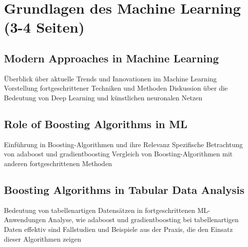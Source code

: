\section{Grundlagen des Machine Learning (3-4 Seiten)}
\subsection{Modern Approaches in Machine Learning}
Überblick über aktuelle Trends und Innovationen im Machine Learning
Vorstellung fortgeschrittener Techniken und Methoden
Diskussion über die Bedeutung von Deep Learning und künstlichen neuronalen Netzen
\subsection{Role of Boosting Algorithms in ML}
Einführung in Boosting-Algorithmen und ihre Relevanz
Spezifische Betrachtung von \gls{adaboost} und \gls{gradientboosting}
Vergleich von Boosting-Algorithmen mit anderen fortgeschrittenen Methoden
\subsection{Boosting Algorithms in Tabular Data Analysis}
Bedeutung von tabellenartigen Datensätzen in fortgeschrittenen ML-Anwendungen
Analyse, wie \gls{adaboost} und \gls{gradientboosting} bei tabellenartigen Daten effektiv sind
Fallstudien und Beispiele aus der Praxis, die den Einsatz dieser Algorithmen zeigen
